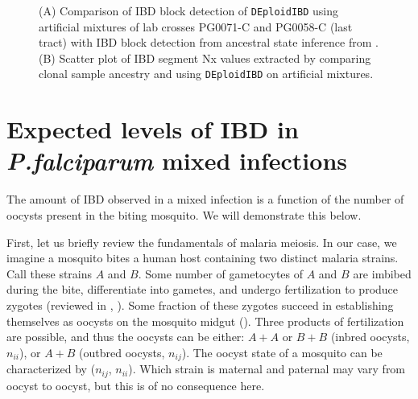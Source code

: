 \documentclass[9pt]{article}
\begin{document}
\begin{figure}[ht]
  \centering{}
  \caption{(A) Comparison of IBD block detection of {\tt DEploidIBD} using artificial mixtures of lab crosses PG0071-C and PG0058-C (last tract) with IBD block detection from ancestral state inference from \citet{Li2003}. (B) Scatter plot of IBD segment Nx values extracted by comparing clonal sample ancestry and using {\tt DEploidIBD} on artificial mixtures.}\label{fig:bgibd}
\end{figure}

\newpage
\FloatBarrier
\section{Expected levels of IBD in \textit{ P.falciparum } mixed infections}

The amount of IBD observed in a mixed infection is a function of the number of oocysts present in the biting mosquito. We will demonstrate this below.

First, let us briefly review the fundamentals of malaria meiosis. In our case, we imagine a mosquito bites a human host containing two distinct malaria strains. Call these strains $A$ and $B$. Some number of gametocytes of $A$ and $B$ are imbibed during the bite, differentiate into gametes, and undergo fertilization to produce zygotes (reviewed in \citet{Gosh2000}, \citet{Bennink2016}). Some fraction of these zygotes succeed in establishing themselves as oocysts on the mosquito midgut (\citet{Gosh2000}). Three products of fertilization are possible, and thus the oocysts can be either: $A+A$ or $B+B$ (inbred oocysts, $n_{ii}$), or $A+B$ (outbred oocysts, $n_{ij}$). The oocyst state of a mosquito can be characterized by ($n_{ij}$, $n_{ii}$). Which strain is maternal and paternal may vary from oocyst to oocyst, but this is of no consequence here.
\end{document}
